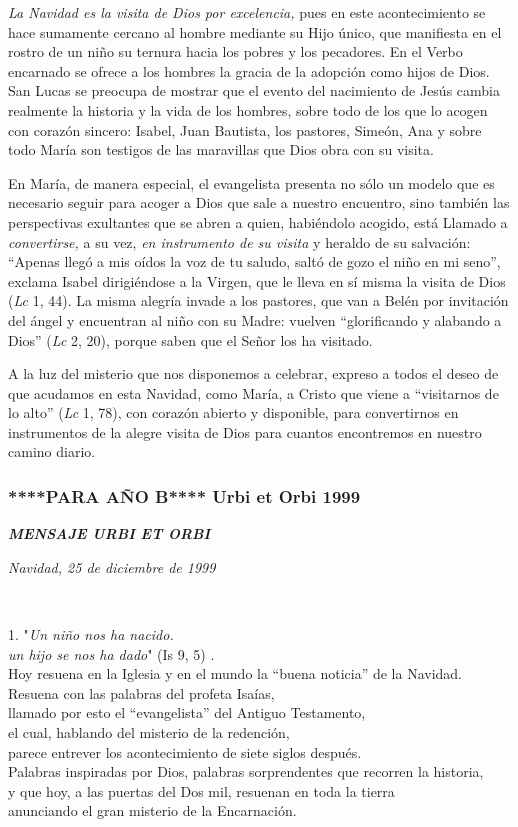 \emph{La Navidad es la visita de Dios por excelencia,} pues en este
acontecimiento se hace sumamente cercano al hombre mediante su Hijo
único, que manifiesta en el rostro de un niño su ternura hacia los
pobres y los pecadores. En el Verbo encarnado se ofrece a los hombres la
gracia de la adopción como hijos de Dios. San Lucas se preocupa de
mostrar que el evento del nacimiento de Jesús cambia realmente la
historia y la vida de los hombres, sobre todo de los que lo acogen con
corazón sincero: Isabel, Juan Bautista, los pastores, Simeón, Ana y
sobre todo María son testigos de las maravillas que Dios obra con su
visita.

En María, de manera especial, el evangelista presenta no sólo un modelo
que es necesario seguir para acoger a Dios que sale a nuestro encuentro,
sino también las perspectivas exultantes que se abren a quien,
habiéndolo acogido, está Llamado a \emph{convertirse,} a su vez,
\emph{en instrumento de su visita} y heraldo de su salvación: ``Apenas
llegó a mis oídos la voz de tu saludo, saltó de gozo el niño en mi
seno'', exclama Isabel dirigiéndose a la Virgen, que le lleva en sí
misma la visita de Dios (\emph{Lc} 1, 44). La misma alegría invade a los
pastores, que van a Belén por invitación del ángel y encuentran al niño
con su Madre: vuelven ``glorificando y alabando a Dios'' (\emph{Lc} 2,
20), porque saben que el Señor los ha visitado.

A la luz del misterio que nos disponemos a celebrar, expreso a todos el
deseo de que acudamos en esta Navidad, como María, a Cristo que viene a
``visitarnos de lo alto'' (\emph{Lc} 1, 78), con corazón abierto y
disponible, para convertirnos en instrumentos de la alegre visita de
Dios para cuantos encontremos en nuestro camino diario.

\subsubsection{****PARA AÑO B**** Urbi et Orbi 1999}
\textbf{\emph{MENSAJE URBI ET ORBI}}

\emph{Navidad, 25 de diciembre de 1999}

~

1. "\emph{Un niño nos ha nacido.\\
	un hijo se nos ha dado}" (Is 9, 5) .\\
Hoy resuena en la Iglesia y en el mundo la ``buena noticia'' de la
Navidad.\\
Resuena con las palabras del profeta Isaías,\\
llamado por esto el ``evangelista'' del Antiguo Testamento,~\\
el cual, hablando del misterio de la redención,\\
parece entrever los acontecimiento de siete siglos después.\\
Palabras inspiradas por Dios, palabras sorprendentes que recorren la
historia,~\\
y que hoy, a las puertas del Dos mil, resuenan en toda la tierra\\
anunciando el gran misterio de la Encarnación.

